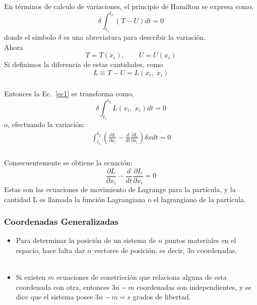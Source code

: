 \documentclass{beamer}
\begin{document}
\begin{frame}
\justifying
\frametitle{}
En términos de calculo de variaciones, el principio de Hamilton se expresa como,
\begin{equation}
\label{ec1}
\delta \int_{t_1}^{t_2} (T-U) dt =0 
\end{equation}
donde el símbolo $\delta$ es una abreviatura para describir la variación.
\\ Ahora 
\begin{equation}
T=T(\dot{x}_i), \qquad U=U(x_i)
\end{equation}
Si definimos la diferencia de estas cantidades, como 
\begin{equation}
L \equiv T -U =L(x_i, \;\dot{x}_i)
\end{equation}
\end{frame}
%
\begin{frame}
\justifying
\frametitle{}
Entonces la Ec.~\ref{ec1} se transforma como,
\begin{equation}
\label{1}
\delta \int_{t_1}^{t_2} L(x_i, \;\dot{x}_i) dt =0 
\end{equation}
o, efectuando la variación:
\begin{eqnarray}
\int_{t_1}^{t_2}\left( \frac{\partial L}{\partial x_i} - \frac{d}{dt} \frac{\partial L}{\partial \dot{x_i}} \right) \delta x dt =0 
\end{eqnarray}
\end{frame}
%
\begin{frame}
\justifying
\frametitle{}
Consecuentemente se obtiene la ecuación:
\begin{equation}
\frac{\partial L}{\partial x_i} - \frac{d}{dt} \frac{\partial L}{\partial \dot{x_i}} = 0
\end{equation}
Estas son las ecuaciones de movimiento de Lagrange para la partícula, y la cantidad L es llamada la función Lagrangiana o el lagrangiano de la partícula.
\end{frame}
%
\begin{frame}
\justifying
\frametitle{Coordenadas Generalizadas}
\begin{itemize}
\justifying
\item Para determinar la posición de un sistema de $n$ puntos materiales en el espacio, hace falta dar $n$ vectores de posición, es decir, $3n$ coordenadas. \\ \ \\
\item  Si existen $m$ ecuaciones de constricción que relaciona alguna de esta coordenada con otra, entonces $3n-m$ coordenadas son independientes, y se dice que el sistema posee $3n-m=s$ grados de libertad.
\end{itemize}
\end{frame}
\end{document}
